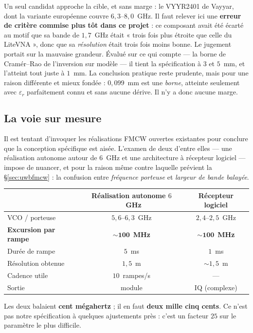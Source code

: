 \documentclass[11pt,a4paper]{article}
\newcommand{\eps}{\varepsilon_r}
\begin{document}
Un seul candidat approche la cible, et sans marge : le VYYR2401 de Vayyar, dont
la variante européenne couvre $6{,}3$--$8{,}0$~GHz. Il faut relever ici une
\textbf{erreur de critère commise plus tôt dans ce projet} : ce composant avait
été écarté au motif que sa bande de $1{,}7$~GHz était « trois fois plus étroite
que celle du LiteVNA », donc que sa \emph{résolution} était trois fois moins
bonne. Le jugement portait sur la mauvaise grandeur. Évalué sur ce qui compte
--- la borne de Cramér--Rao de l'inversion sur modèle --- il tient la
spécification à $3$ et $5$~mm, et l'atteint tout juste à $1$~mm. La conclusion
pratique reste prudente, mais pour une raison différente et mieux fondée :
$0{,}099$~mm est une \emph{borne}, atteinte seulement avec $\eps$ parfaitement
connu et sans aucune dérive. Il n'y a donc aucune marge.

\subsection{La voie sur mesure}
\label{sec:surmesure}

Il est tentant d'invoquer les réalisations FMCW ouvertes existantes pour
conclure que la conception spécifique est aisée. L'examen de deux d'entre elles
--- une réalisation autonome autour de $6$~GHz et une architecture à récepteur
logiciel --- impose de nuancer, et pour la raison même contre laquelle
prévient la \S\ref{sec:uwbfmcw} : la confusion entre \emph{fréquence porteuse}
et \emph{largeur de bande balayée}.

\begin{table}[h]
\centering
\begin{tabular}{lcc}
\toprule
& Réalisation autonome $6$~GHz & Récepteur logiciel \\
\midrule
VCO / porteuse & $5{,}6$--$6{,}3$~GHz & $2{,}4$--$2{,}5$~GHz \\
\textbf{Excursion par rampe} & $\mathbf{\sim 100}$~\textbf{MHz}
  & $\mathbf{\sim 100}$~\textbf{MHz} \\
Durée de rampe & $5$~ms & $1$~ms \\
Résolution obtenue & $1{,}5$~m & $\sim 1{,}5$~m \\
Cadence utile & $10$~rampes/s & --- \\
Sortie & module & IQ (complexe) \\
\bottomrule
\end{tabular}
\end{table}

Les deux balaient \textbf{cent mégahertz} ; il en faut \textbf{deux mille cinq
cents}. Ce n'est pas notre spécification à quelques ajustements près : c'est un
facteur $25$ sur le paramètre le plus difficile.
\end{document}
